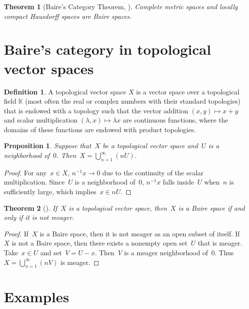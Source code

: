\documentclass[11pt,a4paper]{article}
\newtheorem{theorem}{Theorem}[section]
\newtheorem{proposition}{Proposition}[section]
\theoremstyle{definition}
\newtheorem{definition}{Definition}[section]
\def\KK{\mathbb{K}}
\numberwithin{equation}{section}
\begin{document}
\begin{theorem}[Baire's Category Theorem, {\cite[Theorem~48.2]{Munkres_2000}}]
  \label{th:Baire}
  Complete metric spaces and locally compact Hausdorff spaces are Baire spaces.
\end{theorem}


\section{Baire's category in topological vector spaces}

\begin{definition}
 A topological vector space $X$ is a vector space over a topological field $\KK$ (most often the
 real or complex numbers with their standard topologies) that is endowed with a topology such that
 the vector addition $(x,y)\mapsto x+y$ and scalar multiplication $(\lambda, x) \mapsto \lambda x$ are continuous functions, where the domains of these
 functions are endowed with product topologies.
\end{definition}

\begin{proposition}
  Suppose that~$X$ be a topological vector space and~$U$ is a neighborhood of~$0$.
  Then~$X=\bigcup_{n=1}^\infty (nU)$. 
\end{proposition}

\begin{proof}
  For any~$x\in X$, $n^{-1} x\to 0$ due to the continuity of the scalar multiplication. 
  Since~$U$ is a neighborhood of~$0$,
  $n^{-1} x$ falls inside~$U$ when~$n$ is sufficiently large, which implies~$x\in n U$.
\end{proof}

\begin{theorem}[{\cite[Theorem~11.6.7]{Narici_Beckenstein_2010}}]
  If~$X$ is a topological vector space, then~$X$ is a Baire space if and only if it is not meager. 
\end{theorem}

\begin{proof}
 If~$X$ is a Baire space, then it is not meager as an open subset of itself.  If~$X$ is not a Baire
 space, then there exists a nonempty open set~$U$ that is meager. Take~$x\in U$ and set~$V=U-x$.
 Then~$V$ is a meager neighborhood of~$0$. Thus~$X=\bigcup_{n=1}^\infty (nV)$ is meager. 
\end{proof}

\section{Examples}
\end{document}
